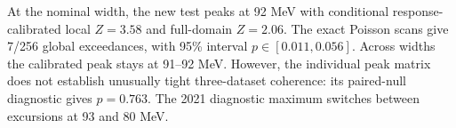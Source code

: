 At the nominal width, the new test peaks at 92 MeV with conditional response-calibrated local $Z=3.58$ and full-domain $Z=2.06$. The exact Poisson scans give 7/256 global exceedances, with 95\% interval $p\in[0.011,0.056]$. Across widths the calibrated peak stays at 91--92 MeV. However, the individual peak matrix does not establish unusually tight three-dataset coherence: its paired-null diagnostic gives $p=0.763$. The 2021 diagnostic maximum switches between excursions at 93 and 80 MeV.
